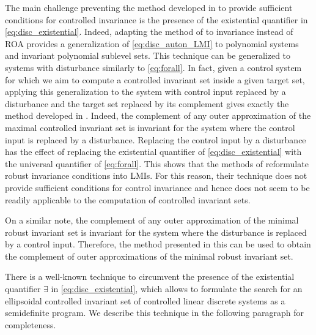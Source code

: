 \documentclass[11pt,twoside,a4paper,openright]{uclouvain-thesis}
\begin{document}
\begin{myrem}
  The main challenge preventing the method developed in \cite{henrion2014convex, korda2014convex, korda2013inner} to provide
  sufficient conditions for controlled invariance is the presence of the existential quantifier in
  \eqref{eq:disc_existential}. Indeed, adapting the method of \cite{korda2013inner} to invariance instead of ROA provides a generalization of \eqref{eq:disc_auton_LMI}
  to polynomial systems and invariant polynomial sublevel sets.
  This technique can be generalized to systems with disturbance similarly to \eqref{eq:forall}.
  In fact, given a control system for which we aim to compute a controlled invariant set inside a given target set,
  applying this generalization to the system with control input replaced by a disturbance and the target set replaced by its complement
  gives exactly the method developed in \cite{korda2014convex}.
  Indeed, the complement of any outer approximation of the maximal controlled invariant set is invariant for the system
  where the control input is replaced by a disturbance.
  Replacing the control input by a disturbance has the effect of replacing the existential quantifier of \eqref{eq:disc_existential}
  with the universal quantifier of \eqref{eq:forall}.
  This shows that the methods of \cite{henrion2014convex, korda2014convex, korda2013inner}
  reformulate robust invariance conditions into LMIs. %
  For this reason, their technique does not provide sufficient conditions for control invariance and hence
  does not seem to be readily applicable to the computation of controlled invariant sets.

  On a similar note, the complement of any outer approximation of the minimal robust invariant set is invariant for the system
  where the disturbance is replaced by a control input.
  Therefore, the method presented in this  can be used to obtain the
  complement of outer approximations of the minimal robust invariant set.
\end{myrem}

There is a well-known technique to circumvent the presence of the existential
quantifier $\exists$ in \eqref{eq:disc_existential}, which allows to formulate the search for an ellipsoidal
controlled invariant set of controlled linear discrete systems as a semidefinite
program. We describe this technique in the following paragraph for completeness.
\end{document}
